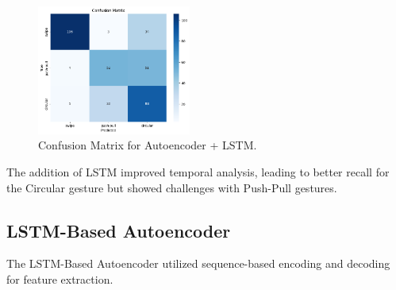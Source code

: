 \documentclass[10pt,twocolumn,letterpaper]{article}
\begin{document}
\begin{table}[h]
\small
\begin{center}
\caption{Performance Metrics for Autoencoder + LSTM}
\vspace{0.1cm}
\end{center}
\end{table}

\begin{figure}[h]
  \centering
  \includegraphics[width=0.45\textwidth]{figures/confusion_matrix_autoencoder_lstm.png}
  \caption{Confusion Matrix for Autoencoder + LSTM.}
  \label{fig:confusion_matrix_autoencoder_lstm}
\end{figure}

The addition of LSTM improved temporal analysis, leading to better recall for the Circular gesture but showed challenges with Push-Pull gestures.

\subsection{LSTM-Based Autoencoder}

The LSTM-Based Autoencoder utilized sequence-based encoding and decoding for feature extraction.
\end{document}
